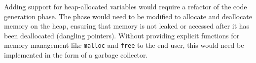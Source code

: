 Adding support for heap-allocated variables would require a refactor of the code generation phase.
The phase would need to be modified to allocate and deallocate memory on the heap, ensuring that
memory is not leaked or accessed after it has been deallocated (dangling pointers). Without
providing explicit functions for memory management like \texttt{malloc} and \texttt{free} to the
end-user, this would need be implemented in the form of a garbage collector.

